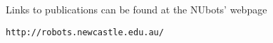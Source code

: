 \documentclass{llncs}
\begin{document}
\noindent Links to publications can be found at the NUbots' webpage
\begin{center}
\texttt{http://robots.newcastle.edu.au/}
\end{center}




%
%
%
\end{document}
